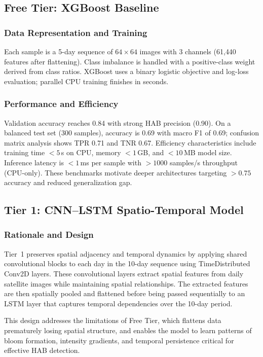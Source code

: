\documentclass[conference]{IEEEtran}
\begin{document}
\subsection{Free Tier: XGBoost Baseline}

\subsubsection{Data Representation and Training}
Each sample is a 5-day sequence of $64\times64$ images with 3 channels (61{,}440 features after flattening). Class imbalance is handled with a positive-class weight derived from class ratios. XGBoost uses a binary logistic objective and log-loss evaluation; parallel CPU training finishes in seconds.

\subsubsection{Performance and Efficiency}
Validation accuracy reaches 0.84 with strong HAB precision (0.90). On a balanced test set (300 samples), accuracy is 0.69 with macro F1 of 0.69; confusion matrix analysis shows TPR 0.71 and TNR 0.67. Efficiency characteristics include training time $<\!5$\,s on CPU, memory $<\!1$\,GB, and $<\!10$\,MB model size. Inference latency is $<\!1$\,ms per sample with $>\!1000$ samples/s throughput (CPU-only). These benchmarks motivate deeper architectures targeting $>\!0.75$ accuracy and reduced generalization gap.

\subsection{Tier 1: CNN--LSTM Spatio-Temporal Model}

\subsubsection{Rationale and Design}
Tier~1 preserves spatial adjacency and temporal dynamics by applying shared convolutional blocks to each day in the 10-day sequence using TimeDistributed Conv2D layers. These convolutional layers extract spatial features from daily satellite images while maintaining spatial relationships. The extracted features are then spatially pooled and flattened before being passed sequentially to an LSTM layer that captures temporal dependencies over the 10-day period.

This design addresses the limitations of Free Tier, which flattens data prematurely losing spatial structure, and enables the model to learn patterns of bloom formation, intensity gradients, and temporal persistence critical for effective HAB detection.
\end{document}
